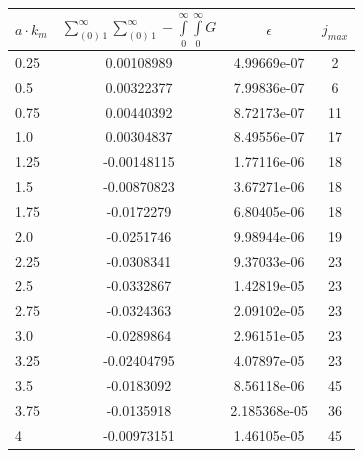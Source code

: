 \documentclass[twoside, 10pt, ptm]{article}
\begin{document}
\begin{multicols}{2}
\begin{center}
\begin{tabular}{ | l | c | c | c | }
\hline
$a \cdot k_m$ & $\sum\limits_{\left(0\right)\,1}^{\infty}\sum\limits_{\left(0\right)\,1}^{\infty}-\int\limits_{0}^{\infty}\int\limits_{0}^{\infty}G$ & $\epsilon$ & $j_{max}$ \\
\hline
0.25 & 0.00108989 & 4.99669e-07 & 2 \\
0.5 & 0.00322377 & 7.99836e-07 & 6 \\
0.75 & 0.00440392 & 8.72173e-07 & 11 \\
1.0 & 0.00304837 & 8.49556e-07 & 17 \\
1.25 & -0.00148115 & 1.77116e-06 & 18 \\
1.5 & -0.00870823 & 3.67271e-06 & 18 \\
1.75 & -0.0172279 & 6.80405e-06 & 18 \\
2.0 & -0.0251746 & 9.98944e-06 & 19 \\
2.25 & -0.0308341 & 9.37033e-06 & 23 \\
2.5 & -0.0332867 & 1.42819e-05 & 23 \\
2.75 & -0.0324363 & 2.09102e-05 & 23 \\
3.0 & -0.0289864 & 2.96151e-05 & 23 \\

3.25 & -0.02404795 & 4.07897e-05 & 23 \\
3.5 & -0.0183092 & 8.56118e-06 & 45 \\
3.75 & -0.0135918 & 2.185368e-05 & 36 \\
4 & -0.00973151 & 1.46105e-05 & 45 \\


\end{tabular}
\end{center}
\end{multicols}
\end{document}
